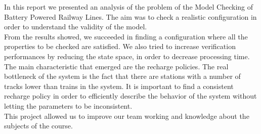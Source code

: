 In this report we presented an analysis of the problem of the Model Checking of Battery Powered Railway Lines.
The aim was to check a realistic configuration in order to understand the validity of the model.\\
From the results showed, we succeeded in finding a configuration where all the properties to be checked are satisfied.
We also tried to increase verification performances by reducing the state space, in order to decrease processing time.
The main characteristic that emerged are the recharge policies. The real bottleneck of the system is the fact that
there are stations with a number of tracks lower than trains in the system. It is important to find a consistent recharge
policy in order to efficiently describe the behavior of the system without letting the parameters to be inconsistent.\\
This project allowed us to improve our team working and knowledge about the subjects of the course.
